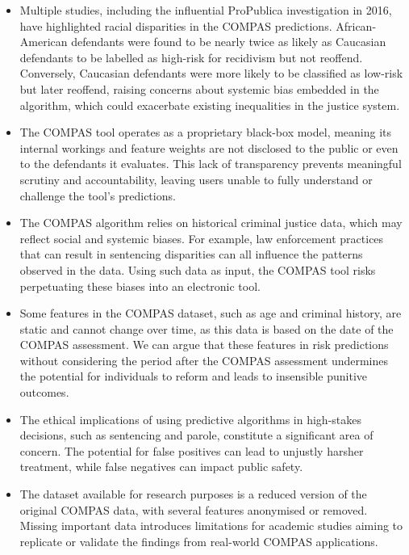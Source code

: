 \documentclass[conference]{IEEEtran}
\begin{document}
	
	\begin{itemize}
		\item Multiple studies, including the influential ProPublica investigation in 2016, have highlighted racial disparities in the COMPAS predictions. African-American defendants were found to be nearly twice as likely as Caucasian defendants to be labelled as high-risk for recidivism but not reoffend. Conversely, Caucasian defendants were more likely to be classified as low-risk but later reoffend, raising concerns about systemic bias embedded in the algorithm, which could exacerbate existing inequalities in the justice system.
	
		\item The COMPAS tool operates as a proprietary black-box model, meaning its internal workings and feature weights are not disclosed to the public or even to the defendants it evaluates. This lack of transparency prevents meaningful scrutiny and accountability, leaving users unable to fully understand or challenge the tool's predictions.
	
		\item The COMPAS algorithm relies on historical criminal justice data, which may reflect social and systemic biases. For example, law enforcement practices that can result in sentencing disparities can all influence the patterns observed in the data. Using such data as input, the COMPAS tool risks perpetuating these biases into an electronic tool.
	
		\item Some features in the COMPAS dataset, such as age and criminal history, are static and cannot change over time, as this data is based on the date of the COMPAS assessment. We can argue that these features in risk predictions without considering the period after the COMPAS assessment undermines the potential for individuals to reform and leads to insensible punitive outcomes.
	
		\item The ethical implications of using predictive algorithms in high-stakes decisions, such as sentencing and parole, constitute a significant area of concern. The potential for false positives can lead to unjustly harsher treatment, while false negatives can impact public safety.
	
		\item The dataset available for research purposes is a reduced version of the original COMPAS data, with several features anonymised or removed. Missing important data introduces limitations for academic studies aiming to replicate or validate the findings from real-world COMPAS applications.
	\end{itemize}
	
\end{document}
